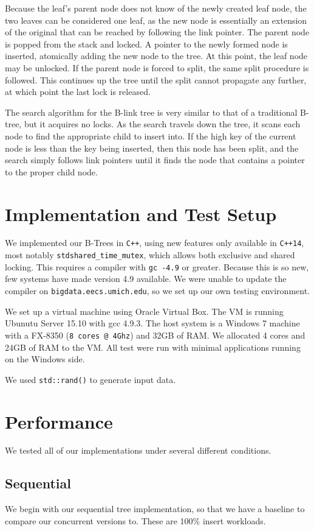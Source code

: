 \documentclass{sig-alternate}
\begin{document}
Because the leaf's parent node does not know of the newly created leaf node, the two leaves can be considered one leaf, as the new node is essentially an extension of the original that can be reached by following the link pointer. The parent node is popped from the stack and locked. A pointer to the newly formed node is inserted, atomically adding the new node to the tree. At this point, the leaf node may be unlocked. If the parent node is forced to split, the same split procedure is followed. This continues up the tree until the split cannot propagate any further, at which point the last lock is released.

The search algorithm for the B-link tree is very similar to that of a traditional B-tree, but it acquires no locks. As the search travels down the tree, it scans each node to find the appropriate child to insert into. If the high key of the current node is less than the key being inserted, then this node has been split, and the search simply follows link pointers until it finds the node that contains a pointer to the proper child node.
\section{Implementation and Test Setup}
We implemented our B-Trees in \texttt{C++}, using new features only available in \texttt{C++14}, most notably \texttt{stdshared\_time\_mutex}, which allows both exclusive and shared locking.  This requires a compiler with \texttt{gc -4.9} or greater.  Because this is so new, few systems have made version 4.9 available. We were unable to update the compiler on \texttt{bigdata.eecs.umich.edu}, so we set up our own testing environment.

We set up a virtual machine using Oracle Virtual Box.  The VM is running Ubunutu Server 15.10 with gcc 4.9.3.  The host system is a Windows 7 machine with a FX-8350 (\texttt{8 cores @ 4Ghz}) and 32GB of RAM.  We allocated 4 cores and 24GB of RAM to the VM.  All test were run with minimal applications running on the Windows side.

We used \texttt{std::rand()} to generate input data.  

\section{Performance}
We tested all of our implementations under several different conditions.

\subsection{Sequential}
We begin with our sequential tree implementation, so that we have a baseline to compare our concurrent versions to.  These are 100\% insert workloads.
\end{document}
